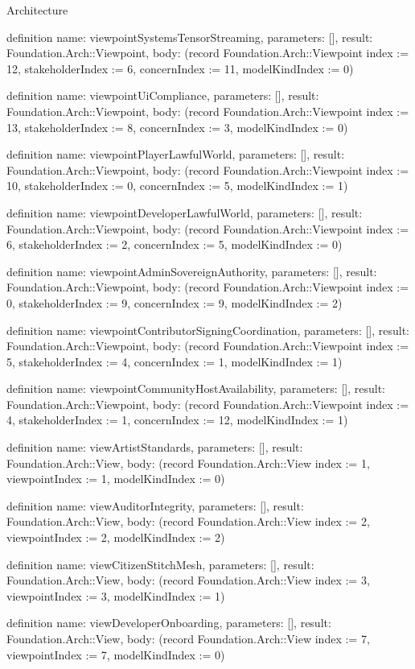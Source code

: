 \begin{lexlean}{Architecture}
\begin{semanticmodule}
definition{
  name: viewpointSystemsTensorStreaming,
  parameters: [],
  result: Foundation.Arch::Viewpoint,
  body: (record Foundation.Arch::Viewpoint {index := 12, stakeholderIndex := 6, concernIndex := 11, modelKindIndex := 0})
}

definition{
  name: viewpointUiCompliance,
  parameters: [],
  result: Foundation.Arch::Viewpoint,
  body: (record Foundation.Arch::Viewpoint {index := 13, stakeholderIndex := 8, concernIndex := 3, modelKindIndex := 0})
}

definition{
  name: viewpointPlayerLawfulWorld,
  parameters: [],
  result: Foundation.Arch::Viewpoint,
  body: (record Foundation.Arch::Viewpoint {index := 10, stakeholderIndex := 0, concernIndex := 5, modelKindIndex := 1})
}

definition{
  name: viewpointDeveloperLawfulWorld,
  parameters: [],
  result: Foundation.Arch::Viewpoint,
  body: (record Foundation.Arch::Viewpoint {index := 6, stakeholderIndex := 2, concernIndex := 5, modelKindIndex := 0})
}

definition{
  name: viewpointAdminSovereignAuthority,
  parameters: [],
  result: Foundation.Arch::Viewpoint,
  body: (record Foundation.Arch::Viewpoint {index := 0, stakeholderIndex := 9, concernIndex := 9, modelKindIndex := 2})
}

definition{
  name: viewpointContributorSigningCoordination,
  parameters: [],
  result: Foundation.Arch::Viewpoint,
  body: (record Foundation.Arch::Viewpoint {index := 5, stakeholderIndex := 4, concernIndex := 1, modelKindIndex := 1})
}

definition{
  name: viewpointCommunityHostAvailability,
  parameters: [],
  result: Foundation.Arch::Viewpoint,
  body: (record Foundation.Arch::Viewpoint {index := 4, stakeholderIndex := 1, concernIndex := 12, modelKindIndex := 1})
}

definition{
  name: viewArtistStandards,
  parameters: [],
  result: Foundation.Arch::View,
  body: (record Foundation.Arch::View {index := 1, viewpointIndex := 1, modelKindIndex := 0})
}

definition{
  name: viewAuditorIntegrity,
  parameters: [],
  result: Foundation.Arch::View,
  body: (record Foundation.Arch::View {index := 2, viewpointIndex := 2, modelKindIndex := 2})
}

definition{
  name: viewCitizenStitchMesh,
  parameters: [],
  result: Foundation.Arch::View,
  body: (record Foundation.Arch::View {index := 3, viewpointIndex := 3, modelKindIndex := 1})
}

definition{
  name: viewDeveloperOnboarding,
  parameters: [],
  result: Foundation.Arch::View,
  body: (record Foundation.Arch::View {index := 7, viewpointIndex := 7, modelKindIndex := 0})
}


\end{semanticmodule}
\end{lexlean}
